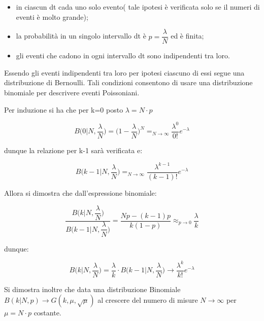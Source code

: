 \documentclass[11pt,a4paper]{book}
\begin{document}
\begin{itemize}
	\item in ciascun dt cada uno solo evento( tale ipotesi \`{e} verificata solo se il numeri di eventi \`{e} molto grande);
	\item la probabilit\`{a} in un singolo intervallo dt \`{e} $p = \dfrac{\lambda}{N}$ ed \`{e} finita;
	\item gli eventi che cadono in ogni intervallo dt sono indipendenti tra loro.
	
\end{itemize}

Essendo gli eventi indipendenti tra loro per ipotesi ciascuno di essi segue una distribuzione di Bernoulli. Tali condizioni consentono di usare una distribuzione binomiale per descrivere eventi Poissoniani.

Per induzione si ha che per k=0 posto $\lambda = N \cdot p$

\begin{equation*}
	B \Big (0\vert N, \dfrac{\lambda}{N} \Big ) = \Big (1- \dfrac{\lambda}{N} \Big )^N =_{N \rightarrow \infty} \dfrac{\lambda^0}{0!}e^{-\lambda}
\end{equation*}

dunque la relazione per k-1 sar\`{a} verificata e:

\begin{equation*}
	B \Big (k-1\vert N,\frac{\lambda}{N} \Big ) =_{N \rightarrow \infty} \dfrac{\lambda^{k-1}}{(k-1)!} e^{- \lambda}
\end{equation*}

Allora si dimostra che dall'espressione binomiale:

\begin{equation*}
	\dfrac{B \Big (k  \vert N , \dfrac{\lambda}{N}\Big)}{B \Big(k-1 \vert N, \dfrac{\lambda}{N} \Big) } = \dfrac{Np- (k-1)p}{k(1-p)} \approx_{p \rightarrow 0} \dfrac{\lambda}{k}
\end{equation*}


 dunque:
 
 \begin{equation*}
 	B \Big (k  \vert N , \dfrac{\lambda}{N}\Big) = \dfrac{\lambda}{k} \cdot B \Big(k-1 \vert N, \dfrac{\lambda}{N} \Big) \rightarrow \dfrac{\lambda^{k}}{k!} e^{-\lambda}
 \end{equation*}
\newline

Si dimostra inoltre che data una distribuzione Binomiale $B(k \vert N,p) \rightarrow G(k,\mu,\sqrt{\mu})$ al crescere del numero di misure $N \rightarrow \infty $ per $\mu = N \cdot p$ costante.
\newline
\end{document}
